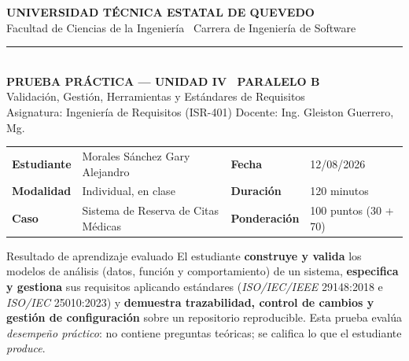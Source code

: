 \documentclass[11pt,a4paper,oneside]{article}
\begin{document}
	\newpage
	\sffamily
	
	\begin{center}
		{\Large\bfseries\color{darkblue} UNIVERSIDAD T\'ECNICA ESTATAL DE QUEVEDO}\\[2pt]
		{\normalsize\color{midblue} Facultad de Ciencias de la Ingenier\'ia \textbullet\ Carrera de Ingenier\'ia de Software}\\[6pt]
		{\color{gold}\rule{0.9\linewidth}{1.2pt}}\\[6pt]
		{\large\bfseries\color{darkblue} PRUEBA PR\'ACTICA --- UNIDAD IV \textbullet\ PARALELO B}\\[2pt]
		{\normalsize\color{darkblue} Validaci\'on, Gesti\'on, Herramientas y Est\'andares de Requisitos}\\[2pt]
		{\small\color{black} Asignatura: Ingenier\'ia de Requisitos (ISR-401) \quad\textbullet\quad Docente: Ing. Gleiston Guerrero, Mg.}
	\end{center}
	
	\vspace{2pt}
	\begin{center}\small
		\begin{tabularx}{\linewidth}{@{}L{2.6cm} X L{2.6cm} X@{}}
			\toprule
			\textbf{Estudiante} & Morales S\'anchez Gary Alejandro & \textbf{Fecha} & 12/08/2026\\
			\textbf{Modalidad} & Individual, en clase & \textbf{Duraci\'on} & 120 minutos \\
			\textbf{Caso} & Sistema de Reserva de Citas M\'edicas & \textbf{Ponderaci\'on} & 100 puntos (30 + 70) \\
			\bottomrule
		\end{tabularx}
	\end{center}
	
	\begin{concepto}{Resultado de aprendizaje evaluado}
		El estudiante \textbf{construye y valida} los modelos de an\'alisis (datos, funci\'on y comportamiento) de un sistema, \textbf{especifica y gestiona} sus requisitos aplicando est\'andares (\textit{ISO/IEC/IEEE} 29148:2018 e \textit{ISO/IEC} 25010:2023) y \textbf{demuestra trazabilidad, control de cambios y gesti\'on de configuraci\'on} sobre un repositorio reproducible. Esta prueba eval\'ua \emph{desempe\~no pr\'actico}: no contiene preguntas te\'oricas; se califica lo que el estudiante \emph{produce}.
	\end{concepto}
	
\end{document}
